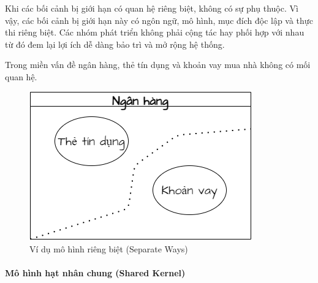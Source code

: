 Khi các bối cảnh bị giới hạn có quan hệ riêng biệt, không có sự phụ thuộc. Vì vậy, các bối cảnh bị giới hạn này có ngôn ngữ, mô hình, mục đích độc lập và thực thi riêng biệt. Các nhóm phát triển không phải cộng tác hay phối hợp với nhau từ đó đem lại lợi ích dễ dàng bảo trì và mở rộng hệ thống.

\begin{example} Trong miền vấn đề ngân hàng, thẻ tín dụng và khoản vay mua nhà không có mối quan hệ.

    \begin{figure}[H]

    \centering

    \includegraphics[scale = 0.5]{pictures/mo_hinh_rieng_biet_separate_ways/main.drawio.png}

    \caption{Ví dụ mô hình riêng biệt (Separate Ways)}

    \end{figure}

\end{example}

\paragraph{Mô hình hạt nhân chung (Shared Kernel)}




